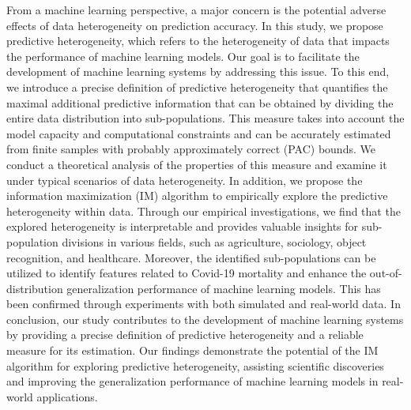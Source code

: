 From a machine learning perspective, a major concern is the potential adverse effects of data heterogeneity on prediction accuracy. 
In this study, we propose predictive heterogeneity, which refers to the heterogeneity of data that impacts the performance of machine learning models. 
Our goal is to facilitate the development of machine learning systems by addressing this issue.
To this end, we introduce a precise definition of predictive heterogeneity that quantifies the maximal additional predictive information that can be obtained by dividing the entire data distribution into sub-populations. 
This measure takes into account the model capacity and computational constraints and can be accurately estimated from finite samples with probably approximately correct (PAC) bounds. 
We conduct a theoretical analysis of the properties of this measure and examine it under typical scenarios of data heterogeneity.
In addition, we propose the information maximization (IM) algorithm to empirically explore the predictive heterogeneity within data. 
Through our empirical investigations, we find that the explored heterogeneity is interpretable and provides valuable insights for sub-population divisions in various fields, such as agriculture, sociology, object recognition, and healthcare. 
Moreover, the identified sub-populations can be utilized to identify features related to Covid-19 mortality and enhance the out-of-distribution generalization performance of machine learning models. 
This has been confirmed through experiments with both simulated and real-world data.
In conclusion, our study contributes to the development of machine learning systems by providing a precise definition of predictive heterogeneity and a reliable measure for its estimation. 
Our findings demonstrate the potential of the IM algorithm for exploring predictive heterogeneity, assisting scientific discoveries and improving the generalization performance of machine learning models in real-world applications.








